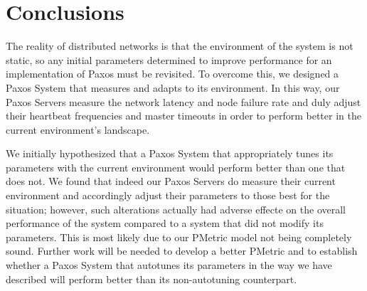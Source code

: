 
\section{Conclusions}
The reality of distributed networks is that the environment of the system is not static, so any initial parameters determined to improve performance for an implementation of Paxos must be revisited.  To overcome this, we designed a Paxos System that measures and adapts to its environment.  In this way, our Paxos Servers measure the network latency and node failure rate and duly adjust their heartbeat frequencies and master timeouts in order to perform better in the current environment's landscape.

We initially hypothesized that a Paxos System that appropriately tunes its parameters with the current environment would perform better than one that does not.  We found that indeed our Paxos Servers do measure their current environment and accordingly adjust their parameters to those best for the situation; however, such alterations actually had adverse effecte on the overall performance of the system compared to a system that did not modify its parameters.  This is most likely due to our PMetric model not being completely sound.  Further work will be needed to develop a better PMetric and to establish whether a Paxos System that autotunes its parameters in the way we have described will perform better than its non-autotuning counterpart.